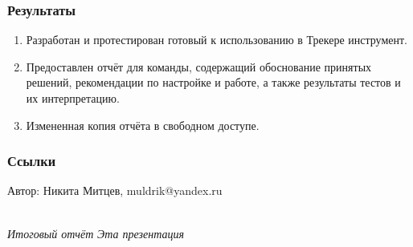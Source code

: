 \documentclass[14pt,aspectratio=169,hyperref={pdftex,unicode},xcolor=dvipsnames]{beamer}
\begin{document}
\begin{frame}
\frametitle{Результаты}

\begin{enumerate}
  \item Разработан и протестирован готовый к использованию в Трекере инструмент.
  \item Предоставлен отчёт для команды, содержащий обоснование принятых решений, рекомендации по настройке и работе, а также результаты тестов и их интерпретацию.
  \item Измененная копия отчёта в свободном доступе.
\end{enumerate}

\end{frame}

\begin{frame}
  \frametitle{Ссылки}
  \begin{center}
    Автор: Никита Митцев, muldrik@yandex.ru \\
  \end{center}
   \hfill
  \\
{\small
  \textit{Итоговый отчёт}\hfill
  \textit{Эта презентация}
}
\end{frame}
\end{document}
